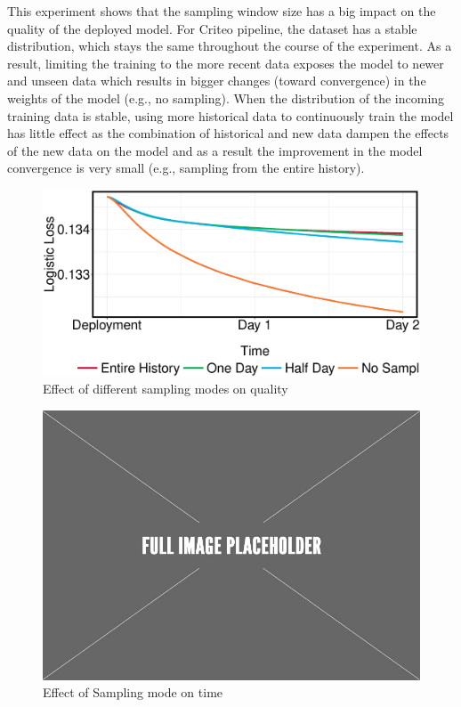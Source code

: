 This experiment shows that the sampling window size has a big impact on the quality of the deployed model.
For Criteo pipeline, the dataset has a stable distribution, which stays the same throughout the course of the experiment.
As a result, limiting the training to the more recent data exposes the model to newer and unseen data which results in bigger changes (toward convergence) in the weights of the model (e.g., no sampling).
When the distribution of the incoming training data is stable, using more historical data to continuously train the model has little effect as the combination of historical and new data dampen the effects of the new data on the model and as a result the improvement in the model convergence is very small (e.g., sampling from the entire history).


\begin{figure}[h!]
\centering
\includegraphics[width=\columnwidth]{../images/experiment-results/criteo-sampling-mode-experiments.eps}
\caption{Effect of different sampling modes on quality}
\label{fig:sampling-mode-quality}
\vspace{2mm}
\end{figure}

\begin{figure}[h!]
\centering
\includegraphics[width=\columnwidth]{../images/placeholder.jpeg}
\caption{Effect of Sampling mode on time}
\label{fig:sampling-mode-time}
\vspace{2mm}
\end{figure}



